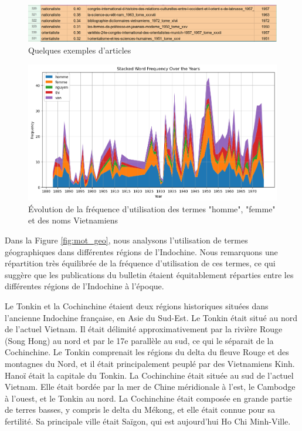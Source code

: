 \begin{figure}[H] %
    \centering
    \includegraphics[width=1\linewidth]{img/nationaliste.PNG}
    \caption{Quelques exemples d'articles}
    \label{fig:enter-label}
\end{figure}

\begin{figure}[H] %
    \centering
    \includegraphics[width=12cm]{img/2.12.name_viet.png}
    \caption{Évolution de la fréquence d'utilisation des termes "homme", "femme" et des noms Vietnamiens}
    \label{fig:name_viet}
\end{figure}


Dans la Figure \ref{fig:mot_geo}, nous analysons l'utilisation de termes géographiques dans différentes régions de l'Indochine. Nous remarquons une répartition très équilibrée de la fréquence d'utilisation de ces termes, ce qui suggère que les publications du bulletin étaient équitablement réparties entre les différentes régions de l'Indochine à l'époque.

Le Tonkin et la Cochinchine étaient deux régions historiques situées dans l'ancienne Indochine française, en Asie du Sud-Est. 
Le Tonkin était situé au nord de l'actuel Vietnam.
Il était délimité approximativement par la rivière Rouge (Song Hong) au nord et par le 17e parallèle au sud, ce qui le séparait de la Cochinchine.
Le Tonkin comprenait les régions du delta du fleuve Rouge et des montagnes du Nord, et il était principalement peuplé par des Vietnamiens Kinh. Hanoï était la capitale du Tonkin.
La Cochinchine était située au sud de l'actuel Vietnam.
Elle était bordée par la mer de Chine méridionale à l'est, le Cambodge à l'ouest, et le Tonkin au nord. La Cochinchine était composée en grande partie de terres basses, y compris le delta du Mékong, et elle était connue pour sa fertilité. Sa principale ville était Saïgon, qui est aujourd'hui Ho Chi Minh-Ville.


